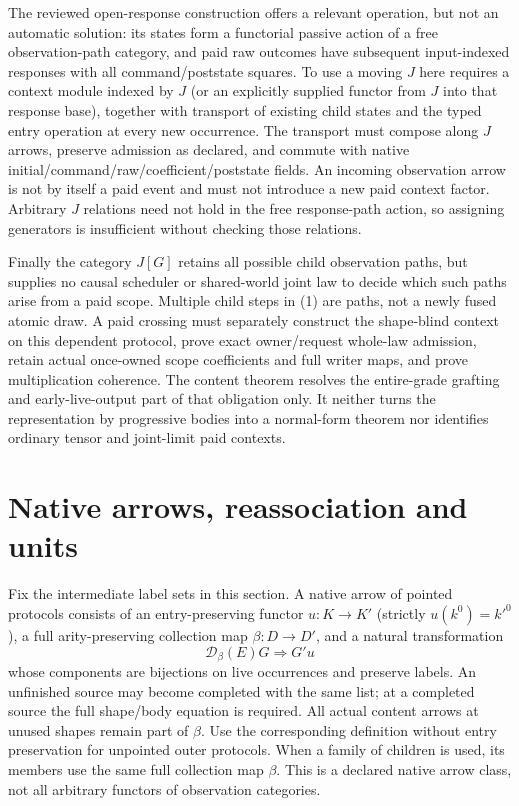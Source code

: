 \documentclass[11pt]{article}
\begin{document}
The reviewed open-response construction offers a relevant operation, but not an automatic solution: its states form a functorial passive action of a free observation-path category, and paid raw outcomes have subsequent input-indexed responses with all command/poststate squares. To use a moving $J$ here requires a context module indexed by $J$ (or an explicitly supplied functor from $J$ into that response base), together with transport of existing child states and the typed entry operation at every new occurrence. The transport must compose along $J$ arrows, preserve admission as declared, and commute with native initial/command/raw/coefficient/poststate fields. An incoming observation arrow is not by itself a paid event and must not introduce a new paid context factor. Arbitrary $J$ relations need not hold in the free response-path action, so assigning generators is insufficient without checking those relations.

Finally the category $J[G]$ retains all possible child observation paths, but supplies no causal scheduler or shared-world joint law to decide which such paths arise from a paid scope. Multiple child steps in (1) are paths, not a newly fused atomic draw. A paid crossing must separately construct the shape-blind context on this dependent protocol, prove exact owner/request whole-law admission, retain actual once-owned scope coefficients and full writer maps, and prove multiplication coherence. The content theorem resolves the entire-grade grafting and early-live-output part of that obligation only. It neither turns the representation by progressive bodies into a normal-form theorem nor identifies ordinary tensor and joint-limit paid contexts.

\section{Native arrows, reassociation and units}
Fix the intermediate label sets in this section. A native arrow of pointed protocols consists of an entry-preserving functor $u:K\to K'$ (strictly $u(k^0)=k'^0$), a full arity-preserving collection map $\beta:D\to D'$, and a natural transformation
\[
 \mathcal D_\beta(E)G\Longrightarrow G'u
\]
whose components are bijections on live occurrences and preserve labels. An unfinished source may become completed with the same list; at a completed source the full shape/body equation is required. All actual content arrows at unused shapes remain part of $\beta$. Use the corresponding definition without entry preservation for unpointed outer protocols. When a family of children is used, its members use the same full collection map $\beta$. This is a declared native arrow class, not all arbitrary functors of observation categories.
\end{document}
